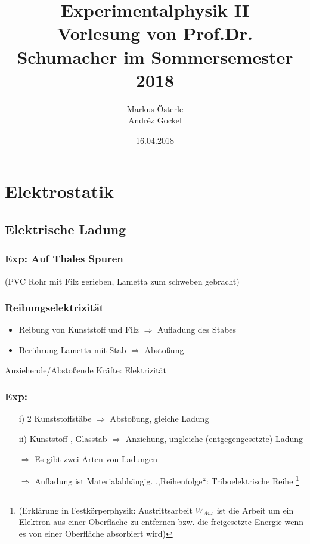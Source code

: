 \documentclass[titlepage,12pt,a4paper,ngerman]{report}
\begin{document}
\renewcommand{\thechapter}{\Roman{chapter}}

\title{
  {\Huge Experimentalphysik II }\\[1em]
  {\Large Vorlesung von Prof.Dr. Schumacher im Sommersemester 2018}}
\author{Markus Österle\\ Andréz Gockel}
\date{16.04.2018}
\maketitle
\tableofcontents


\chapter{Elektrostatik}
\section{Elektrische Ladung}
\subsection*{Exp: Auf Thales Spuren}
(PVC Rohr mit Filz gerieben, Lametta zum schweben gebracht)
\subsection{Reibungselektrizität}
\begin{itemize}
\item Reibung von Kunststoff und Filz $\Rightarrow$ Aufladung des Stabes
\item Berührung Lametta mit Stab $\Rightarrow$ Abstoßung
\end{itemize}
{\large Anziehende/Abstoßende Kräfte: Elektrizität}
\subsection*{Exp:}
\begin{itemize}
\item[i)] 2 Kunststoffstäbe $\Rightarrow$ Abstoßung, gleiche Ladung
\item[ii)] Kunststoff-, Glasstab $\Rightarrow$ Anziehung, ungleiche (entgegengesetzte) Ladung 
\end{itemize}

\begin{itemize}
\item[$\Rightarrow$] Es gibt zwei Arten von Ladungen
\item[$\Rightarrow$] Aufladung ist Materialabhängig. ,,Reihenfolge``: Triboelektrische   Reihe \footnote{(Erklärung in Festkörperphysik: Austrittsarbeit $W_{Aus}$ ist die Arbeit um ein Elektron aus einer Oberfläche zu entfernen bzw. die freigesetzte Energie wenn es von einer Oberfläche absorbiert wird)}
\end{itemize}
\end{document}
